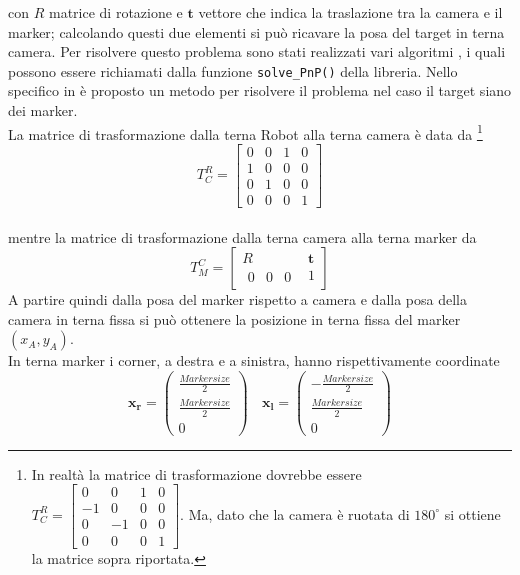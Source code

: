   con $R$ matrice di rotazione e $ \boldsymbol{t}$ vettore che indica la traslazione tra la camera e il marker; calcolando questi due elementi si può ricavare la 
  posa del target in terna camera. Per risolvere questo problema sono stati realizzati vari algoritmi \cite{marchand2015pose}, i quali possono essere richiamati dalla 
  funzione \texttt{solve\_PnP()} della libreria. Nello specifico in \cite{infinitesimal} è proposto un metodo per risolvere il problema nel caso il target siano dei
  marker. \\
  La matrice di trasformazione dalla terna Robot alla terna camera è data da \footnote{In realtà la matrice di trasformazione dovrebbe essere $T^R_C = \begin{bmatrix} 0 & 0 & 1 & 0 \\ -1 & 0 & 0 & 0 \\ 0 & -1 & 0 & 0 \\ 0 & 0 & 0 & 1 \end{bmatrix} $. Ma, dato che la camera è ruotata di $180^{\circ}$ si ottiene la matrice sopra riportata. }   
\begin{equation}
T^R_C = \begin{bmatrix} 0 & 0 & 1 & 0 \\ 1 & 0 & 0 & 0 \\ 0 & 1 & 0 & 0 \\ 0 & 0 & 0 & 1 \end{bmatrix} 
\end{equation}\\ mentre la matrice di trasformazione dalla terna camera alla terna marker da 
\begin{equation}
T^C_M = \begin{bmatrix} R & \boldsymbol{t} \\ \begin{matrix} 0 & 0  & 0 \end{matrix} & 1 \end{bmatrix}
\end{equation}
  A partire quindi dalla posa del marker rispetto a camera e dalla posa della camera in terna fissa si può ottenere la posizione in terna fissa del marker $(x_A, y_A)$.\\
  In terna marker i corner, a destra e a sinistra, hanno rispettivamente coordinate
  \[
     {\boldsymbol{x_r}}=\begin{pmatrix} \frac{Markersize}{2} \\ \frac{Markersize}{2} \\ 0 \end{pmatrix} \ \ \ \;
     {\boldsymbol{x_l}}=\begin{pmatrix} -\frac{Markersize}{2} \\ \frac{Markersize}{2} \\ 0 \end{pmatrix}
  \]
